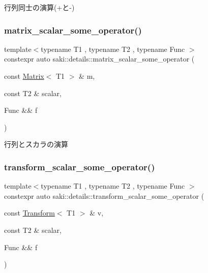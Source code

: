 行列同士の演算(+と-\/) 

\mbox{\label{namespacesaki_1_1details_a3b467138701d036240cfbf728d3a7a2d}} 
\subsubsection{\texorpdfstring{matrix\+\_\+scalar\+\_\+some\+\_\+operator()}{matrix\_scalar\_some\_operator()}}
{\footnotesize\ttfamily template$<$typename T1 , typename T2 , typename Func $>$ \\
constexpr auto saki\+::details\+::matrix\+\_\+scalar\+\_\+some\+\_\+operator (\begin{DoxyParamCaption}\item[{const \mbox{\hyperlink{classsaki_1_1_matrix}{Matrix}}$<$ T1 $>$ \&}]{m,  }\item[{const T2 \&}]{scalar,  }\item[{Func \&\&}]{f }\end{DoxyParamCaption})}



行列とスカラの演算 

\mbox{\label{namespacesaki_1_1details_a438d746d0acdacae59451776394228ee}} 
\subsubsection{\texorpdfstring{transform\+\_\+scalar\+\_\+some\+\_\+operator()}{transform\_scalar\_some\_operator()}}
{\footnotesize\ttfamily template$<$typename T1 , typename T2 , typename Func $>$ \\
constexpr auto saki\+::details\+::transform\+\_\+scalar\+\_\+some\+\_\+operator (\begin{DoxyParamCaption}\item[{const \mbox{\hyperlink{classsaki_1_1_transform}{Transform}}$<$ T1 $>$ \&}]{v,  }\item[{const T2 \&}]{scalar,  }\item[{Func \&\&}]{f }\end{DoxyParamCaption})}



